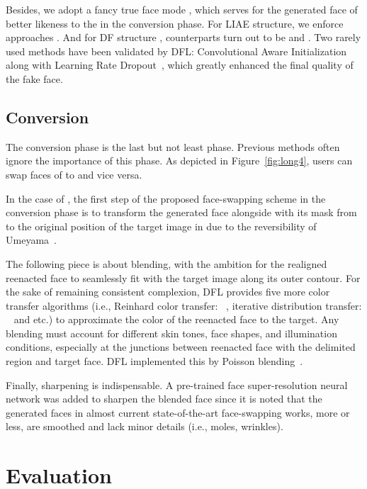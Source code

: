 \documentclass[10pt,twocolumn,letterpaper]{article}
\begin{document}
Besides, we adopt a fancy true face mode , which serves for the generated face of better likeness to the  in the conversion phase. For LIAE structure, we enforce  approaches . And for DF structure
, counterparts turn out to be  and . Two rarely used methods have been validated by DFL: Convolutional Aware Initialization~\cite{CAI2017} along with Learning Rate Dropout~\cite{LearningDropout2019}, which greatly enhanced the final quality of the fake face. 



\subsection{Conversion}




The conversion phase is the last but not least phase. Previous methods often ignore the importance of this phase. As depicted in Figure~\ref{fig:long4}, users can swap faces of  to  and vice versa.

In the case of , the first step of the proposed face-swapping scheme in the conversion phase is to transform the generated face alongside with its mask from   to the original position of the target image in  due to the reversibility of Umeyama~\cite{umeyama1991least}.

The following piece is about blending, with the ambition for the realigned reenacted face to seamlessly fit with the target image along its outer contour.
For the sake of remaining consistent complexion, DFL provides five more color transfer algorithms (i.e., Reinhard color transfer: ~\cite{reinhard2001color}, iterative distribution transfer: ~\cite{pitie2007automated} and etc.) to approximate the color of the reenacted face to the target.
Any blending must account for different skin tones, face shapes, and illumination conditions, especially at the junctions between reenacted face with the delimited region and target face. DFL implemented this by Poisson blending~\cite{perez2003poisson}.

Finally, sharpening is indispensable. A pre-trained face super-resolution neural network was added to sharpen the blended face since it is noted that the generated faces in almost current state-of-the-art face-swapping works, more or less, are smoothed and lack minor details (i.e., moles, wrinkles).



\section{Evaluation}
\end{document}
